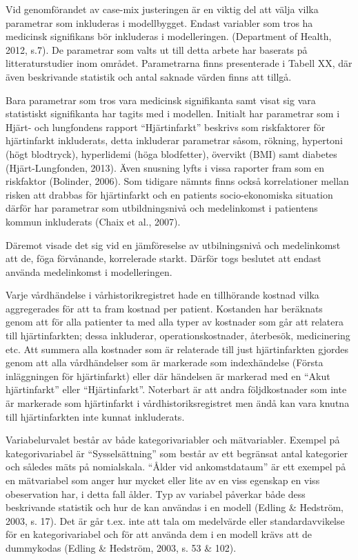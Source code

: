 Vid genomförandet av case-mix justeringen är en viktig del att välja vilka parametrar som inkluderas i modellbygget. Endast variabler som tros ha medicinsk signifikans bör inkluderas i modelleringen. (Department of Health, 2012, s.7). De parametrar som valts ut till detta arbete har baserats på litteraturstudier inom området. Parametrarna finns presenterade i Tabell XX, där även beskrivande statistik och antal saknade värden finns att tillgå.



Bara parametrar som tros vara medicinsk signifikanta samt visat sig vara statistiskt signifikanta har tagits med i modellen. Initialt har parametrar som i Hjärt- och lungfondens rapport “Hjärtinfarkt” beskrivs som riskfaktorer för hjärtinfarkt inkluderats, detta inkluderar parametrar såsom, rökning, hypertoni (högt blodtryck), hyperlidemi (höga blodfetter), övervikt (BMI) samt diabetes (Hjärt-Lungfonden, 2013). Även snusning lyfts i vissa raporter fram som en riskfaktor (Bolinder, 2006). Som tidigare nämnts finns också korrelationer mellan risken att drabbas för hjärtinfarkt och en patients socio-ekonomiska situation därför har parametrar som utbildningsnivå och medelinkomst i patientens kommun inkluderats (Chaix et al., 2007).

Däremot visade det sig vid en jämföreselse av utbilningsnivå och medelinkomst att de, föga förvånande, korrelerade starkt. Därför togs beslutet att endast använda medelinkomst i modelleringen.

Varje vårdhändelse i vårhistorikregistret hade en tillhörande kostnad vilka aggregerades för att ta fram kostnad per patient. Kostanden har beräknats genom att för alla patienter ta med alla typer av kostnader som går att relatera till hjärtinfarkten; dessa inkluderar, operationskostnader, återbesök, medicinering etc. Att summera alla kostnader som är relaterade till just hjärtinfarkten gjordes genom att alla vårdhändelser som är markerade som indexhändelse (Första inläggningen för hjärtinfarkt) eller där händelsen är markerad med en “Akut hjärtinfarkt” eller “Hjärtinfarkt”. Noterbart är att andra följdkostnader som inte är markerade som hjärtinfarkt i vårdhistoriksregistret men ändå kan vara knutna till hjärtinfarkten inte kunnat inkluderats.


Variabelurvalet består av både kategorivariabler och mätvariabler. Exempel på kategorivariabel är “Sysselsättning” som består av ett begränsat antal kategorier och således mäts på nomialskala. “Ålder vid ankomstdataum” är ett exempel på en mätvariabel som anger hur mycket eller lite av en viss egenskap en viss obeservation har, i detta fall ålder. Typ av variabel påverkar både dess beskrivande statistik och hur de kan användas i en modell (Edling \& Hedström, 2003, s. 17). Det är går t.ex. inte att tala om medelvärde eller standardavvikelse för en kategorivariabel och för att använda dem i en modell krävs att de dummykodas (Edling \& Hedström, 2003, s. 53 \& 102).

